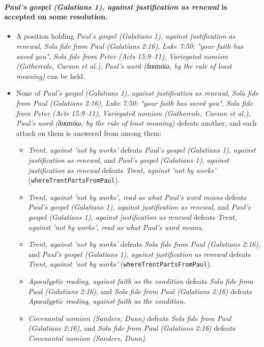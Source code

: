 \documentclass[11pt]{article}
\begin{document}
\paragraph{\emph{Paul's gospel (Galatians 1), against justification as renewal} is accepted on some resolution.}
\begin{itemize}
\item A position holding \emph{Paul's gospel (Galatians 1), against justification as renewal}, \emph{Sola fide from Paul (Galatians 2:16)}, \emph{Luke 7:50: "your faith has saved you"}, \emph{Sola fide from Peter (Acts 15:9–11)}, \emph{Variegated nomism (Gathercole, Carson et al.)}, \emph{Paul's word (δικαιόω, by the rule of least meaning)} can be held.
\item None of \emph{Paul's gospel (Galatians 1), against justification as renewal}, \emph{Sola fide from Paul (Galatians 2:16)}, \emph{Luke 7:50: "your faith has saved you"}, \emph{Sola fide from Peter (Acts 15:9–11)}, \emph{Variegated nomism (Gathercole, Carson et al.)}, \emph{Paul's word (δικαιόω, by the rule of least meaning)} defeats another, and each attack on them is answered from among them:
\begin{itemize}
\item \emph{Trent, against 'not by works'} defeats \emph{Paul's gospel (Galatians 1), against justification as renewal}, and \emph{Paul's gospel (Galatians 1), against justification as renewal} defeats \emph{Trent, against 'not by works'} (\texttt{where\allowbreak{}Trent\allowbreak{}Parts\allowbreak{}From\allowbreak{}Paul}).
\item \emph{Trent, against 'not by works', read as what Paul's word means} defeats \emph{Paul's gospel (Galatians 1), against justification as renewal}, and \emph{Paul's gospel (Galatians 1), against justification as renewal} defeats \emph{Trent, against 'not by works', read as what Paul's word means}.
\item \emph{Trent, against 'not by works'} defeats \emph{Sola fide from Paul (Galatians 2:16)}, and \emph{Paul's gospel (Galatians 1), against justification as renewal} defeats \emph{Trent, against 'not by works'} (\texttt{where\allowbreak{}Trent\allowbreak{}Parts\allowbreak{}From\allowbreak{}Paul}).
\item \emph{Apocalyptic reading, against faith as the condition} defeats \emph{Sola fide from Paul (Galatians 2:16)}, and \emph{Sola fide from Paul (Galatians 2:16)} defeats \emph{Apocalyptic reading, against faith as the condition}.
\item \emph{Covenantal nomism (Sanders, Dunn)} defeats \emph{Sola fide from Paul (Galatians 2:16)}, and \emph{Sola fide from Paul (Galatians 2:16)} defeats \emph{Covenantal nomism (Sanders, Dunn)}.

\end{itemize}
\end{itemize}
\end{document}
